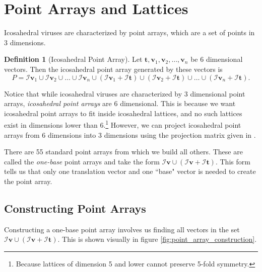 \documentclass[a4paper,10pt]{article}
\theoremstyle{plain}
\theoremstyle{definition}
\newtheorem{Definition}[Theorem]{Definition}
\theoremstyle{remark}
\renewcommand{\vec}[1]{\textbf{#1}}
\begin{document}
\section{Point Arrays and Lattices}
Icosahedral viruses are characterized by point arrays, which are a set of points in 3 dimensions.
\begin{Definition}[Icosahedral Point Array]
    Let \(\vec{t}, \vec{v}_1, \vec{v}_2, \dots, \vec{v}_n\) be 6 dimensional vectors.
    Then the icosahedral point array generated by these vectors is \[P = \mathcal{I}\vec{v}_1 \cup \mathcal{I}\vec{v}_2 \cup \dots \cup \mathcal{I}\vec{v}_n \cup (\mathcal{I}\vec{v}_1 + \mathcal{I}\vec{t}) \cup (\mathcal{I}\vec{v}_2 + \mathcal{I}\vec{t}) \cup \dots \cup (\mathcal{I}\vec{v}_n + \mathcal{I}\vec{t}).\]
\end{Definition}
Notice that while icosahedral viruses are characterized by 3 dimensional point arrays, \emph{icosahedral point arrays} are 6 dimensional.
This is because we want icosahedral point arrays to fit inside icosahedral lattices, and no such lattices exist in dimensions lower than 6.\footnote{Because lattices of dimension 5 and lower cannot preserve 5-fold symmetry.}
However, we can project icosahedral point arrays from 6 dimensions into 3 dimensions using the projection matrix given in \cite{indelicatoetal2012}.

There are 55 standard point arrays from which we build all others.
These are called the \emph{one-base} point arrays and take the form \(\mathcal{I}\vec{v} \cup (\mathcal{I}\vec{v} + \mathcal{I}\vec{t})\). This form tells us that only one translation vector and one ``base" vector is needed to create the point array. \cite{keeftwarock2009affine}

\subsection{Constructing Point Arrays}
Constructing a one-base point array involves us finding all vectors in the set \(\mathcal{I}\vec{v} \cup (\mathcal{I}\vec{v} + \mathcal{I}\vec{t})\).
This is shown visually in figure \ref{fig:point_array_construction}.
\end{document}

